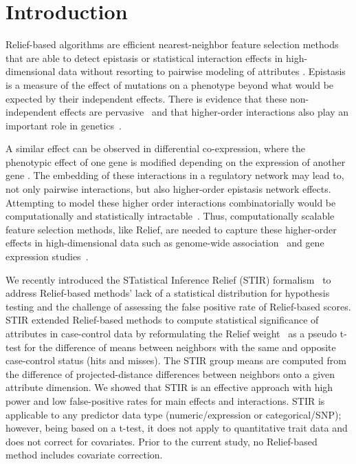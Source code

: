 \documentclass[10pt]{article}
\begin{document}

\linenumbers

\section{Introduction}

Relief-based algorithms are efficient nearest-neighbor feature selection methods that are able to detect epistasis or statistical interaction effects in high-dimensional data without resorting to pairwise modeling of attributes \cite{urbanowicz17b,kononenko97, mckinney09, rendell92}. Epistasis is a measure of the effect of mutations on a phenotype beyond what would be expected by their independent effects. There is evidence that these non-independent effects are pervasive~\cite{breen12} and that higher-order interactions also play an important role in genetics~\cite{weinreich13}. 

A similar effect can be observed in differential co-expression, where the phenotypic effect of one gene is modified depending on the expression of another gene \cite{lareau15,diffcoexp10}. The embedding of these interactions in a regulatory network may lead to, not only pairwise interactions, but also higher-order epistasis network effects. Attempting to model these higher order interactions combinatorially would be computationally and statistically intractable~\cite{riesselman18}. Thus, computationally scalable feature selection methods, like Relief, are needed to capture these higher-order effects in high-dimensional data such as genome-wide association~\cite{titv} and gene expression studies~\cite{stir}.

We recently introduced the STatistical Inference Relief (STIR) formalism~\cite{stir} to address Relief-based methods' lack of a statistical distribution for hypothesis testing and the challenge of assessing the false positive rate of Relief-based scores. STIR extended Relief-based methods to compute statistical significance of attributes in case-control data by reformulating the Relief weight~\cite{mckinney13} as a pseudo t-test for the difference of means between neighbors with the same and opposite case-control status (hits and misses). The STIR group means are computed from the difference of projected-distance differences between neighbors onto a given attribute dimension. We showed that STIR is an effective approach with high power and low false-positive rates for main effects and interactions. STIR is applicable to any predictor data type (numeric/expression or categorical/SNP); however, being based on a t-test, it does not apply to quantitative trait data and does not correct for covariates. Prior to the current study, no Relief-based method includes covariate correction.  
\end{document}
